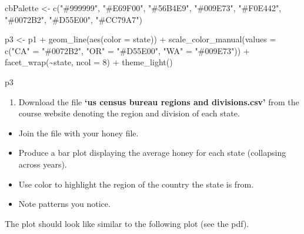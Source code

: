 \documentclass[
]{article}
\newenvironment{Shaded}{\begin{snugshade}}{\end{snugshade}}
\newcommand{\AttributeTok}[1]{\textcolor[rgb]{0.77,0.63,0.00}{#1}}
\newcommand{\DecValTok}[1]{\textcolor[rgb]{0.00,0.00,0.81}{#1}}
\newcommand{\FunctionTok}[1]{\textcolor[rgb]{0.00,0.00,0.00}{#1}}
\newcommand{\NormalTok}[1]{#1}
\newcommand{\OtherTok}[1]{\textcolor[rgb]{0.56,0.35,0.01}{#1}}
\newcommand{\SpecialCharTok}[1]{\textcolor[rgb]{0.00,0.00,0.00}{#1}}
\newcommand{\StringTok}[1]{\textcolor[rgb]{0.31,0.60,0.02}{#1}}
\providecommand{\tightlist}{%
  \setlength{\itemsep}{0pt}\setlength{\parskip}{0pt}}
\begin{document}
\begin{Shaded}
\begin{Highlighting}[]
\NormalTok{cbPalette }\OtherTok{\textless{}{-}} \FunctionTok{c}\NormalTok{(}\StringTok{"\#999999"}\NormalTok{, }\StringTok{"\#E69F00"}\NormalTok{, }\StringTok{"\#56B4E9"}\NormalTok{, }\StringTok{"\#009E73"}\NormalTok{, }\StringTok{"\#F0E442"}\NormalTok{, }\StringTok{"\#0072B2"}\NormalTok{, }\StringTok{"\#D55E00"}\NormalTok{, }\StringTok{"\#CC79A7"}\NormalTok{)}

\NormalTok{p3 }\OtherTok{\textless{}{-}}\NormalTok{ p1 }\SpecialCharTok{+} 
  \FunctionTok{geom\_line}\NormalTok{(}\FunctionTok{aes}\NormalTok{(}\AttributeTok{color =}\NormalTok{ state)) }\SpecialCharTok{+}
  \FunctionTok{scale\_color\_manual}\NormalTok{(}\AttributeTok{values =} \FunctionTok{c}\NormalTok{(}\StringTok{"CA"} \OtherTok{=} \StringTok{"\#0072B2"}\NormalTok{, }\StringTok{"OR"} \OtherTok{=} \StringTok{"\#D55E00"}\NormalTok{, }
                                \StringTok{"WA"} \OtherTok{=} \StringTok{"\#009E73"}\NormalTok{)) }\SpecialCharTok{+}
  \FunctionTok{facet\_wrap}\NormalTok{(}\SpecialCharTok{\textasciitilde{}}\NormalTok{state, }\AttributeTok{ncol =} \DecValTok{8}\NormalTok{) }\SpecialCharTok{+} 
  \FunctionTok{theme\_light}\NormalTok{()}

\NormalTok{p3}
\end{Highlighting}
\end{Shaded}

\begin{enumerate}
\def\labelenumi{\arabic{enumi}.}
\setcounter{enumi}{3}
\tightlist
\item
  Download the file \textbf{`us census bureau regions and
  divisions.csv'} from the course website denoting the region and
  division of each state.
\end{enumerate}

\begin{itemize}
\tightlist
\item
  Join the file with your honey file.
\item
  Produce a bar plot displaying the average honey for each state
  (collapsing across years).
\item
  Use color to highlight the region of the country the state is from.
\item
  Note patterns you notice.
\end{itemize}

The plot should look like similar to the following plot (see the pdf).
\end{document}
